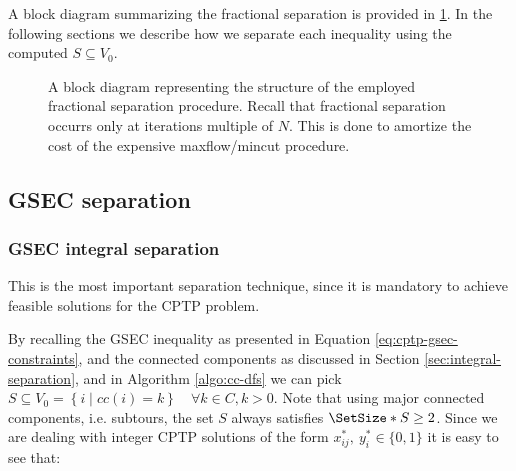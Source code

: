 A block diagram summarizing the fractional separation is provided in \cref{fig:fractional-separation-block-diagram}.
In the following sections we describe how we separate each inequality using the computed $S \subseteq V_0$.

\begin{figure}[ht]
	\centering
	\caption{A block diagram representing the structure of the employed fractional separation procedure. Recall that fractional separation occurrs only at iterations multiple of $N$. This is done to amortize the cost of the expensive maxflow/mincut procedure.}
	\label{fig:fractional-separation-block-diagram}
\end{figure}

\subsection{GSEC separation}
\label{sec:impl-gsec-separation}

\subsubsection{GSEC integral separation}
\label{sec:impl-gsec-integral-separation}

This is the most important separation technique, since it is mandatory to achieve feasible solutions for the CPTP problem.

By recalling the GSEC inequality as presented in Equation \eqref{eq:cptp-gsec-constraints}, and the connected components as discussed in Section \ref{sec:integral-separation}, and in Algorithm \ref{algo:cc-dfs} we can pick $S \subseteq V_0 = \left\{ i \mid cc(i) = k  \right\}   \quad \forall k \in C, k > 0$.
Note that using major connected components, i.e. subtours, the set $S$ always satisfies $\SetSize*{S} \ge 2$.
Since we are dealing with integer CPTP solutions of the form $x^*_{ij},\ y^*_{i} \in \{0, 1\}$ it is easy to see that:


